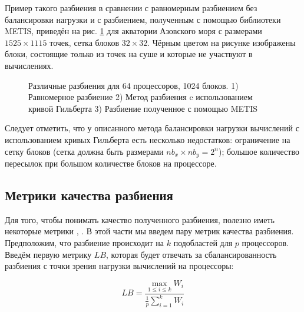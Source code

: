     
Пример такого разбиения в сравнении с равномерным разбиением без балансировки нагрузки и с разбиением, полученным с помощью библиотеки METIS,
приведён на рис. \ref{fig:map_uniform_hilbert_metis} для акватории Азовского моря с размерами $1525 \times 1115$ точек, 
сетка блоков $32 \times 32$.
Чёрным цветом на рисунке изображены блоки, состоящие только из точек на суше и которые не
участвуют в вычислениях.
    
    \begin{figure}[htb!]
    \begin{minipage}[h]{0.32\linewidth}
    \end{minipage}
    \hfill
    \begin{minipage}[h]{0.32\linewidth}
    \end{minipage}
    \hfill
    \begin{minipage}[h]{0.32\linewidth}
    \end{minipage}
    \caption{Различные разбиения для 64 процессоров, 1024 блоков. 1) Равномерное разбиение 2) Метод разбиения c использованием кривой Гильберта 
             3) Разбиение полученное с помощью METIS}
    \label{fig:map_uniform_hilbert_metis}
    \end{figure}
    
Следует отметить, что у описанного метода балансировки нагрузки вычислений с использованием кривых Гильберта есть несколько недостатков:
ограничение на сетку блоков (сетка должна быть размерами $nb_x \times nb_y = 2^n$); 
большое количество пересылок при большом количестве блоков на процессоре.

\subsection{Метрики качества разбиения}
\label{sec:ch2/sec3/lb}

Для того, чтобы понимать качество полученного разбиения, полезно иметь некоторые метрики \cite{Dennis2007}, \cite{Hui2017}.
В этой части мы введем пару метрик качества разбиения. Предположим, что разбиение происходит на $k$ подобластей для $p$ процессоров.
Введём первую метрику $LB$, которая будет отвечать за сбалансированность разбиения с точки зрения нагрузки вычислений на процессоры:

\begin{equation} \label{eq:LB}  
    \displaystyle { LB = \frac{\max_{1 \leq i \leq k} W_i}{\frac{1}{p}\sum_{i=1}^k W_i} }
\end{equation} 


